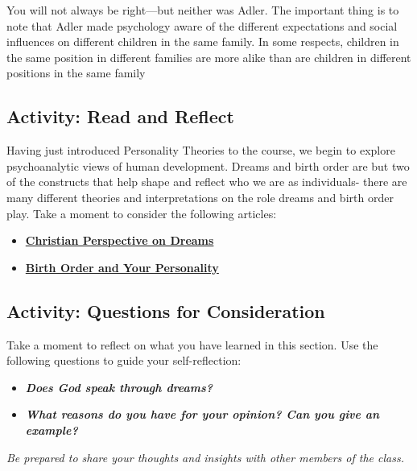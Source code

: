 \documentclass[
]{book}
\providecommand{\tightlist}{%
  \setlength{\itemsep}{0pt}\setlength{\parskip}{0pt}}
\begin{document}
You will not always be right---but neither was Adler. The important thing is to note that Adler made psychology aware of the different expectations and social influences on different children in the same family. In some respects, children in the same position in different families are more alike than are children in differ­ent positions in the same family

\hypertarget{activity-read-and-reflect-3}{%
\subsection*{Activity: Read and Reflect}\label{activity-read-and-reflect-3}}

\begin{reflect}
Having just introduced Personality Theories to the course, we begin to explore psychoanalytic views of human development. Dreams and birth order are but two of the constructs that help shape and reflect who we are as individuals- there are many different theories and interpretations on the role dreams and birth order play. Take a moment to consider the following articles:

\begin{itemize}
\tightlist
\item
  \href{https://www.cgg.org/index.cfm/fuseaction/Library.sr/CT/BQA/k/96/What-Is-Proper-Christian-Perspective-on-Dreams-Visions.htm}{\textbf{Christian Perspective on Dreams}}\\
\item
  \href{https://www.scientificamerican.com/article/ruled-by-birth-order/}{\textbf{Birth Order and Your Personality}}
\end{itemize}
\end{reflect}

\hypertarget{activity-questions-for-consideration-7}{%
\subsection*{Activity: Questions for Consideration}\label{activity-questions-for-consideration-7}}

\begin{reflect}
Take a moment to reflect on what you have learned in this section. Use the following questions to guide your self-reflection:

\begin{itemize}
\tightlist
\item
  \textbf{\emph{Does God speak through dreams?}}\\
\item
  \textbf{\emph{What reasons do you have for your opinion? Can you give an example?}}
\end{itemize}

\emph{Be prepared to share your thoughts and insights with other members of the class.}
\end{reflect}
\end{document}
